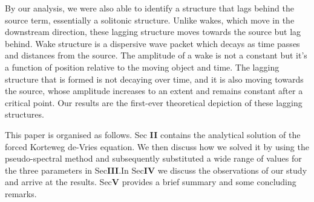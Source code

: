\documentclass[%
 aip,
 amsmath,amssymb,
 reprint,%
]{revtex4-1}
\begin{document}
By our analysis, we were also able to identify a structure that lags behind the source term, essentially a solitonic structure. Unlike wakes, which move in the downstream direction, these lagging structure moves towards the source but lag behind.  Wake structure is  a dispersive wave packet which decays as time passes and distances from the source. The amplitude of a wake is not a constant but it's a function of position relative to the moving object and time. The lagging structure that is formed is not decaying over time, and it is also moving towards the source, whose amplitude increases to an extent and remains constant after a critical point. Our results are the first-ever theoretical depiction of these lagging structures.
\par This paper is organised as follows. Sec \textbf{II} contains the analytical solution of the forced Korteweg de-Vries equation. We then discuss how we solved it by using the pseudo-spectral method and subsequently substituted a wide range of values for the three parameters in Sec\textbf{III}.In Sec\textbf{IV} we discuss the observations of our study and arrive at the results. Sec\textbf{V} provides a brief summary and some concluding remarks. 
\end{document}
